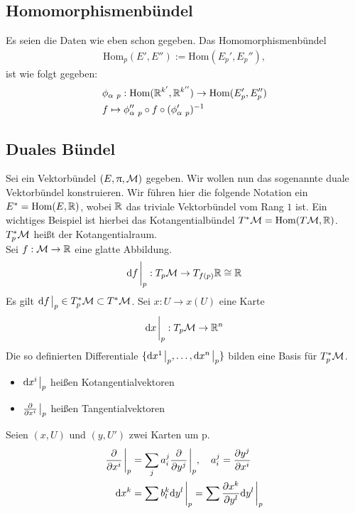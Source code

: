 \subsection{Homomorphismenbündel}
Es seien die Daten wie eben schon gegeben.
Das Homomorphismenbündel
\begin{align}
\mathrm{Hom}_p (E', E'') := \mathrm{Hom}(E_{p}', E_{p}''),
\end{align}
ist wie folgt gegeben:
\begin{align}
&\phi_{\alpha \ p} : \mathrm{Hom}(\R^{k'}, \R^{k''}) \to \mathrm{Hom}(E_{p}', E_{p}'')\\
&f \mapsto \phi_{\alpha \ p}'' \circ f \circ (\phi_{\alpha \ p}')^{-1}
\end{align}

\subsection{Duales Bündel}
Sei ein Vektorbündel $(E, \uppi, \mathcal{M})$ gegeben. 
Wir wollen nun das sogenannte duale Vektorbündel konstruieren.
Wir führen hier die folgende Notation ein $E^* = \mathrm{Hom}(E, \mathbb{R})$, wobei $\mathbb{R}$ das triviale Vektorbündel vom Rang $1$ ist.
Ein wichtiges Beispiel ist hierbei das Kotangentialbündel $T^{*}\mathcal{M} = \mathrm{Hom}(T\mathcal{M} , \mathbb{R})$.
$T^{*}_{p}\mathcal{M}$ heißt der Kotangentialraum.\\
Sei $f: \mathcal{M} \to \mathbb{R}$ eine glatte Abbildung.
\begin{align}
\dd f \eval_p : T_p \mfk \to T_{f(p)}\R \cong \R
\end{align}
Es gilt $\dd f\eval_p \in T_p^* \mfk \subset T^* \mfk$.
Sei $x: U \to x(U)$ eine Karte 
\begin{align}
\dd x \eval_p : T_p \mfk \to \rn
\end{align}
Die so definierten Differentiale $\{ \dd x^1 \eval_p, \dots , \dd x^n \eval_p \}$ bilden eine Basis für $T_p^* \mathcal{M}$.
\begin{itemize}
\item $\dd x^i \eval_p$ heißen Kotangentialvektoren
\item $\pdv{x^i} \eval_p$ heißen Tangentialvektoren
\end{itemize}
Seien $(x, U)$ und $(y, U')$ zwei Karten um p.
\begin{align}
\pdv{x^i}\eval_p &= \sum_j a^j_i \pdv{y^j} \eval_p, \quad a^j_i = \pdv{y^j}{x^i} \\
\dd x^k &= \sum b^k_l \dd y^l \eval_p = \sum \pdv{x^k}{y^l} \dd y^l \eval_p
\end{align}

